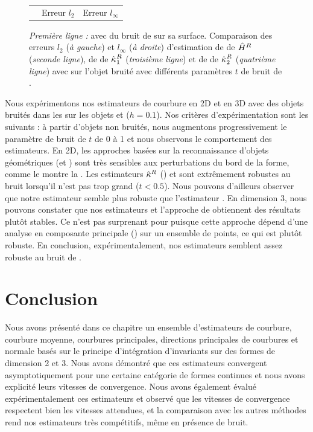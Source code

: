 \begin{figure}[ht]
\begin{center}
\begin{tabular}{@{}l c c @{}}
      &
      Erreur $l_2$ &
      Erreur $l_\infty$
    \end{tabular}
    \caption{
      \emph{Première ligne :} \RoundedCube avec du bruit de \Kanungo sur sa
      surface.
       Comparaison des erreurs $l_2$ (\emph{à gauche}) et $l_\infty$ (\emph{à
       droite}) d'estimation de  de $\hat{H}^{R}$
       (\emph{seconde ligne}), de  de
       $\hat{\kappa_{}}_{1}^{R}$ (\emph{troisième ligne}) et de  de $\hat{\kappa_{}}_{2}^{R}$ (\emph{quatrième ligne}) avec
       \JetFitting sur l'objet \RoundedCube bruité avec différents paramètres $t$
       de bruit de \Kanungo.
      }
      \label{fig:curv-experiments-rounded-noise}
  \end{center}
\end{figure}

Nous expérimentons nos estimateurs de courbure en 2D et en 3D avec des objets bruités
dans les
sur les objets \Ellipse et \RoundedCube ($h = 0.1$). Nos critères
d'expérimentation sont les suivants : à partir d'objets non bruités, nous
augmentons progressivement le paramètre de bruit de \Kanungo $t$ de 0 à 1 et
nous observons le comportement des estimateurs. En 2D, les approches basées sur
la reconnaissance d'objets géométriques (\MDSS et \MDCA) sont très sensibles aux
perturbations du bord de la forme, comme le montre la
. Les estimateurs $\hat{\kappa}^{R}$
(\II) et \BC sont extrêmement robustes au bruit lorsqu'il n'est pas trop grand
($t < 0.5$). Nous pouvons d'ailleurs observer que notre estimateur semble plus
robuste que l'estimateur \BC. En dimension 3, nous pouvons constater que nos
estimateurs et l'approche de \JetFitting obtiennent des résultats plutôt
stables. Ce n'est pas surprenant pour \JetFitting puisque cette approche dépend
d'une analyse en composante principale (\ACP) sur un ensemble de points, ce qui
est plutôt robuste. En conclusion, expérimentalement, nos
estimateurs semblent assez robuste au bruit de \Kanungo.

\section{Conclusion}
\label{sec:estimators:conclusion}

Nous avons présenté dans ce chapitre un ensemble d'estimateurs de courbure,
courbure moyenne, courbures principales, directions principales de courbures et
normale basés sur le principe d'intégration d'invariants sur des formes de
dimension 2 et 3. Nous avons démontré que ces estimateurs convergent
asymptotiquement pour une certaine catégorie de formes continues et nous avons
explicité leurs vitesses de convergence. Nous avons également évalué
expérimentalement ces estimateurs et observé que les vitesses de convergence
respectent bien les vitesses attendues, et la comparaison avec les autres
méthodes rend nos estimateurs très compétitifs, même en présence de bruit.

